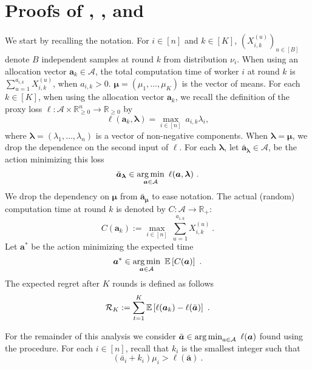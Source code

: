 \section{Proofs of , , and }
\label{sec:proof_1}

We start by recalling the notation. For $i\in [n]$ and $k \in [K]$, $(X^{(u)}_{i,k})_{u \in [B]}$ denote $B$ independent samples at round $k$ from distribution $\nu_i$. When using an allocation vector $\bm{a}_k \in \mathcal{A}$, the total computation time of worker $i$ at round $k$ is $\sum_{u=1}^{a_{i,k}} X^{(u)}_{i,k}$, when $a_{i,k} >0$. $\bm{\mu} = (\mu_1, \dots, \mu_K)$ is the vector of means. For each $k \in [K]$, when using the allocation vector $\bm{a}_k$, we recall the definition of the proxy loss $\ell: \mathcal{A}\times \mathbb{R}_{\ge0}^n \to \mathbb{R}_{\ge0}$ by
$$
\ell(\bm{a}_k, \bm{\lambda}) = \max_{i\in [n]} \ a_{i,k} \lambda_i,
$$
where $\bm{\lambda} = (\lambda_1, \dots, \lambda_n)$ is a vector of non-negative components. When $\bm{\lambda} = \bm{\mu}$, we drop the dependence on the second input of $\ell$.
For each $\bm{\lambda}$, let $\bar{\bm{a}}_{\bm{\lambda}}\in \mathcal{A}$, be the action minimizing this loss
$$
\bar{\bm{a}}_{\bm{\lambda}} \in \operatorname*{arg\,min}_{\bm{a} \in \mathcal{A}} \ \ell(\bm{a}, \bm{\lambda})~.
$$
We drop the dependency on $\bm{\mu}$ from $\bar{\bm{a}}_{\bm{\mu}}$ to ease notation. The actual (random) computation time at round $k$ is denoted by $C: \mathcal{A} \to \mathbb{R}_+$:
\begin{equation}\label{eq:def_C}
	C(\bm{a}_k) := \max_{i\in [n]} \ \sum_{u=1}^{a_{i,k}} X_{i,k}^{(u)}~.
\end{equation}
Let $\bm{a}^*$ be the action minimizing the expected time
$$
\bm{a}^* \in \argmin_{\bm{a} \in \mathcal{A}} \ \E{C(\bm{a})}~.
$$
The expected regret after $K$ rounds is defined as follows
$$
\mathcal{R}_K := \sum_{t=1}^{K} \mathbb{E}\left[\ell(\bm{a}_{k})-\ell(\bar{\bm{a}})\right]~.
$$

\noindent For the remainder of this analysis we consider $\bar{\bm{a}} \in \argmin_{a \in \mathcal{A}} \ \ell(\bm{a})$ found using the  procedure.
For each $i\in [n]$, recall that $k_i$ is the smallest integer such that
\begin{equation}\label{eq:def_n}
	(\bar{a}_i+k_i)\mu_i > \ell(\bar{\bm{a}})~.
\end{equation}

